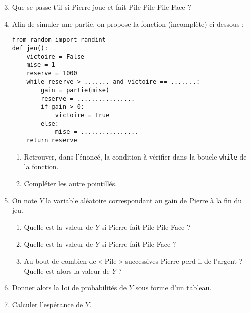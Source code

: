 \documentclass[
	classe=$2^{de}$
]{informatique}
\begin{document}
\begin{enumerate}
	\setcounter{enumi}{2}
	\item Que se passe-t'il si Pierre joue et fait Pile-Pile-Pile-Face ? 
	\item Afin de simuler une partie, on propose la fonction (incomplète) ci-dessous :
	      \begin{lstlisting}
from random import randint
def jeu():
	victoire = False
	mise = 1
	reserve = 1000
	while reserve > ....... and victoire == .......:
		gain = partie(mise)
		reserve = ................
		if gain > 0:
			victoire = True
		else:
			mise = ................
	return reserve
\end{lstlisting}
	      \begin{enumerate}
		      \item Retrouver, dans l'énoncé, la condition à vérifier dans la boucle \texttt{while} de la fonction.
		      \item Compléter les autre pointillés.
	      \end{enumerate}
	\item On note $Y$ la variable aléatoire correspondant au gain de Pierre à la fin du jeu.
	      \begin{enumerate}
		      \item Quelle est la valeur de $Y$ si Pierre fait Pile-Pile-Face ? 
		      \item Quelle est la valeur de $Y$ si Pierre fait Pile-Face ? 
		      \item Au bout de combien de « Pile » successives Pierre perd-il de l'argent ? Quelle est alors la valeur de $Y$ ? 
	      \end{enumerate}
	\item Donner alors la loi de probabilités de $Y$ sous forme d'un tableau.
	\item Calculer l'espérance de $Y$.
\end{enumerate}
\end{document}
